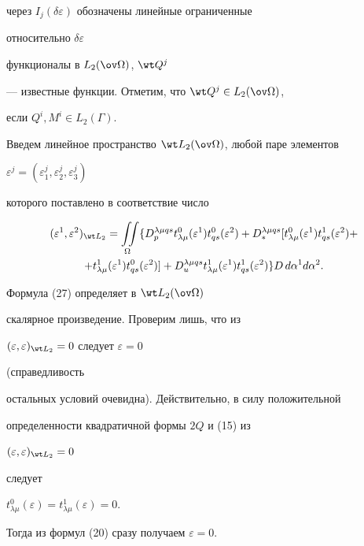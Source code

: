 через $I_j(\delta\varepsilon)$ обозначены линейные ограниченные 


относительно $\delta\varepsilon$ 


функционалы в $L_2(\ov\Omega)$, $\wt Q^j$ 


--- известные функции. Отметим, что $\wt Q^j\in L_2(\ov\Omega)$, 


если $Q^i,M^i\in L_2(\Gamma)$. 


 


Введем линейное пространство $\wt L_2(\ov\Omega)$, любой паре элементов 


$\varepsilon^j=(\varepsilon^j_1,\varepsilon^j_2,\varepsilon^j_3)$ 


которого поставлено в соответствие число 


\begin{multline} 


(\varepsilon^1,\varepsilon^2)_{\wt L_2}= 


\iint\limits_\Omega\{D^{\lambda\mu qs}_p t^0_{\lambda\mu} 


(\varepsilon^1)t^0_{qs}(\varepsilon^2)+ 


D^{\lambda\mu qs}_*[t^0_{\lambda\mu}(\varepsilon^1)t^1_{qs} 


(\varepsilon^2)+ \\ 


+ t^1_{\lambda\mu}(\varepsilon^1)t^0_{qs}(\varepsilon^2)]+ 


D^{\lambda\mu qs}_u t^1_{\lambda\mu}(\varepsilon^1) 


t^1_{qs}(\varepsilon^2)\}D\,d\alpha^1d\alpha^2. 


\end{multline} 


Формула (27) определяет в $\wt L_2(\ov\Omega)$ 


скалярное произведение. Проверим лишь, что из 


$(\varepsilon,\varepsilon)_{\wt L_2}=0$ следует $\varepsilon=0$ 


(справедливость 


остальных условий очевидна). Действительно, в силу положительной 


определенности квадратичной формы $2Q$ и (15) из 


$(\varepsilon,\varepsilon)_{\wt L_2}=0$ 


следует 


$t^0_{\lambda\mu}(\varepsilon)=t^1_{\lambda\mu}(\varepsilon)=0$. 


Тогда из формул (20) сразу получаем $\varepsilon=0$. 


